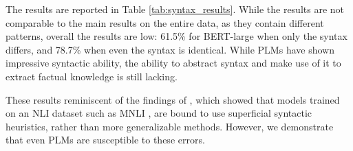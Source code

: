 The results are reported in Table \ref{tab:syntax_results}.  While the results are not comparable to the main results on the entire data, as they contain different patterns, overall the results are low: 61.5\% for BERT-large when only the syntax differs, and 78.7\% when even the syntax is identical.
While PLMs have shown impressive syntactic ability, the ability to abstract syntax and make use of it to extract factual knowledge is still lacking.

These results reminiscent of the findings of \citet{mccoy2019right}, which showed that models trained on an NLI dataset \cite{dagan-rte,snli} such as MNLI \cite{mnli}, are bound to use superficial syntactic heuristics, rather than more generalizable methods.
However, we demonstrate that even PLMs are susceptible to these errors. 